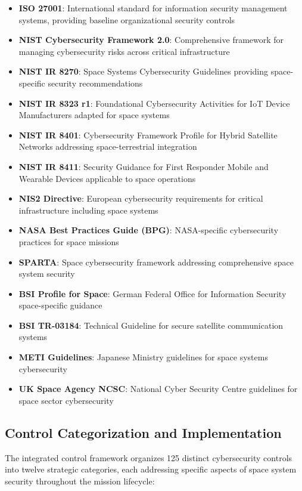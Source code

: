 \documentclass[binding=0.6cm]{sapthesis}
\begin{document}
\begin{itemize}
    \item \textbf{ISO 27001}: International standard for information security management systems, providing baseline organizational security controls
    \item \textbf{NIST Cybersecurity Framework 2.0}: Comprehensive framework for managing cybersecurity risks across critical infrastructure
    \item \textbf{NIST IR 8270}: Space Systems Cybersecurity Guidelines providing space-specific security recommendations
    \item \textbf{NIST IR 8323 r1}: Foundational Cybersecurity Activities for IoT Device Manufacturers adapted for space systems
    \item \textbf{NIST IR 8401}: Cybersecurity Framework Profile for Hybrid Satellite Networks addressing space-terrestrial integration
    \item \textbf{NIST IR 8411}: Security Guidance for First Responder Mobile and Wearable Devices applicable to space operations
    \item \textbf{NIS2 Directive}: European cybersecurity requirements for critical infrastructure including space systems
    \item \textbf{NASA Best Practices Guide (BPG)}: NASA-specific cybersecurity practices for space missions
    \item \textbf{SPARTA}: Space cybersecurity framework addressing comprehensive space system security
    \item \textbf{BSI Profile for Space}: German Federal Office for Information Security space-specific guidance
    \item \textbf{BSI TR-03184}: Technical Guideline for secure satellite communication systems
    \item \textbf{METI Guidelines}: Japanese Ministry guidelines for space systems cybersecurity
    \item \textbf{UK Space Agency NCSC}: National Cyber Security Centre guidelines for space sector cybersecurity
\end{itemize}

\subsection{Control Categorization and Implementation}

The integrated control framework organizes 125 distinct cybersecurity controls into twelve strategic categories, each addressing specific aspects of space system security throughout the mission lifecycle:
\end{document}
